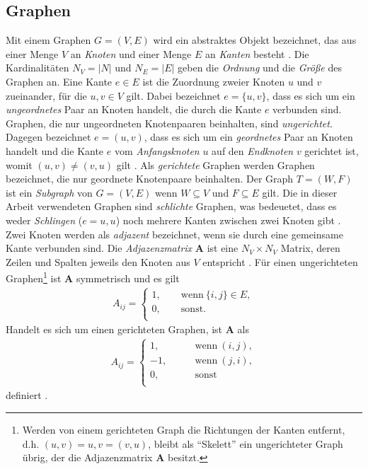 \documentclass[12pt, a4paper]{report}
\begin{document}
\subsection{Graphen}
Mit einem Graphen $G=(V,E)$ wird ein abstraktes Objekt bezeichnet, das aus einer Menge $V$ an \textit{Knoten} und einer Menge $E$ an \textit{Kanten} besteht \cite{brandes2005graphfunda}. Die Kardinalitäten $N_V =|N|$ und $N_E=|E|$ geben die \textit{Ordnung} und die \textit{Größe} des Graphen an. Eine Kante $e \in E$ ist die Zuordnung zweier Knoten $u$ und $v$ zueinander, für die $u,v \in V$ gilt. Dabei bezeichnet $e=\{u,v\}$, dass es sich um ein \textit{ungeordnetes} Paar an Knoten handelt, die durch die Kante $e$ verbunden sind. Graphen, die nur ungeordneten Knotenpaaren beinhalten, sind \textit{ungerichtet}. Dagegen bezeichnet $e=(u,v)$, dass es sich um ein \textit{geordnetes} Paar an Knoten handelt und die Kante $e$ vom \textit{Anfangsknoten} $u$ auf den \textit{Endknoten} $v$ gerichtet ist, womit $(u,v) \neq (v, u)$ gilt \cite{kolaczyk2009statistical}. Als \textit{gerichtete} Graphen werden Graphen bezeichnet, die nur geordnete Knotenpaare beinhalten. Der Graph $T=(W,F)$ ist ein \textit{Subgraph} von $G=(V,E)$ wenn $W \subseteq V$ und $F \subseteq E$ gilt. Die in dieser Arbeit verwendeten Graphen sind \textit{schlichte} Graphen, was bedeuetet, dass es weder \textit{Schlingen} ($e={u,u}$) noch mehrere Kanten zwischen zwei Knoten gibt \cite{tittmann2011graphen}.\\
Zwei Knoten werden als \textit{adjazent} bezeichnet, wenn sie durch eine gemeinsame Kante verbunden sind. Die \textit{Adjazenzmatrix} $\textbf{A}$ ist eine $N_V \times N_V $ Matrix, deren Zeilen und Spalten jeweils den Knoten aus $V$ entspricht \cite{kolaczyk2009statistical}. Für einen ungerichteten Graphen\footnote{Werden von einem gerichteten Graph die Richtungen der Kanten entfernt, d.h. $(u,v)={u,v}=(v,u)$, bleibt als "`Skelett"' ein ungerichteter Graph übrig, der die Adjazenzmatrix $\textbf{A}$ besitzt.} ist $\textbf{A}$ symmetrisch und es gilt 
\begin{align*}
A_{ij} = \begin{cases}
1, \qquad \text{wenn} \ \{i,j\} \in E,\\
0, \qquad \text{sonst.}\\
\end{cases}
\end{align*}
Handelt es sich um einen gerichteten Graphen, ist $\textbf{A}$ als
\begin{align*}
A_{ij} = \begin{cases}
1, \qquad &\text{wenn} \ (i,j),\\
-1, \qquad &\text{wenn} \ (j,i),\\
0, \qquad &\text{sonst}\\
\end{cases}
\end{align*}
definiert \cite{brandes2005graphfunda}.
\end{document}
